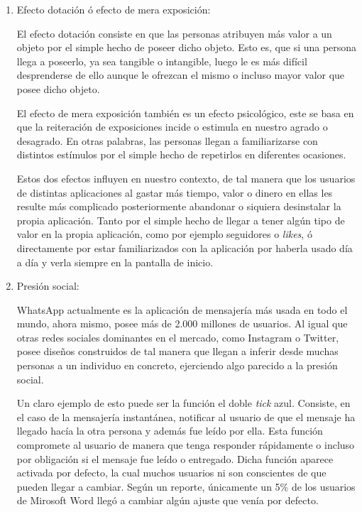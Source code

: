 \begin{enumerate}
    El creador de dicha herramienta, Raskin, expuso en una entrevista su arrepentimiento de haber creado algo tan adictivo \footnote{Raskin además de admitir que nunca pudo predecir lo adictivo que su invento podría ser, también comentó que él mismo está usando un filtro monocromático en su dispositivo móvil para minimizar lo adictivo que puede llegar a ser tener tantos estímulos en la pantalla.}. Su intención era más bien intentar innovar las interfaces que volver a las personas tan adictivas. \cite{Social-Deliberately}

    \item Efecto dotación ó efecto de mera exposición:

    El efecto dotación consiste en que las personas atribuyen más valor a un objeto por el simple hecho de poseer dicho objeto. Esto es, que si una persona llega a poseerlo, ya sea tangible o intangible, luego le es más difícil desprenderse de ello aunque le ofrezcan el mismo o incluso mayor valor que posee dicho objeto.

    El efecto de mera exposición también es un efecto psicológico, este se basa en que la reiteración de exposiciones incide o estimula en nuestro agrado o desagrado. En otras palabras, las personas llegan a familiarizarse con distintos estímulos por el simple hecho de repetirlos en diferentes ocasiones.

    Estos dos efectos influyen en nuestro contexto, de tal manera que los usuarios de distintas aplicaciones al gastar más tiempo, valor o dinero en ellas les resulte más complicado posteriormente abandonar o siquiera desinstalar la propia aplicación. Tanto por el simple hecho de llegar a tener algún tipo de valor en la propia aplicación, como por ejemplo seguidores o \textit{likes}, ó directamente por estar familiarizados con la aplicación por haberla usado día a día y verla siempre en la pantalla de inicio.

    \item Presión social:

    WhatsApp actualmente es la aplicación de mensajería más usada en todo el mundo, ahora mismo, posee más de 2.000 millones de usuarios. \cite{Adiccion-RRSS-WhatsApp} Al igual que otras redes sociales dominantes en el mercado, como Instagram o Twitter, posee diseños construidos de tal manera que llegan a inferir desde muchas personas a un individuo en concreto, ejerciendo algo parecido a la presión social.

    Un claro ejemplo de esto puede ser la función el doble \textit{tick} azul. Consiste, en el caso de la mensajería instantánea, notificar al usuario de que el mensaje ha llegado hacía la otra persona y además fue leído por ella. Esta función compromete al usuario de manera que tenga responder rápidamente o incluso por obligación si el mensaje fue leído o entregado. Dicha función aparece activada por defecto, la cual muchos usuarios ni son conscientes de que pueden llegar a cambiar. Según un reporte, únicamente un 5\% de los usuarios de Mirosoft Word llegó a cambiar algún ajuste que venía por defecto. \cite{Adiccion-RRSS-Settings}


\end{enumerate}
